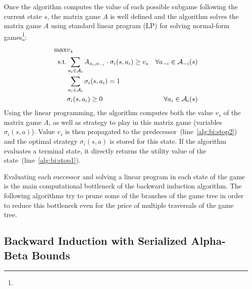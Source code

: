 Once the algorithm computes the value of each possible subgame following the current state $s$, the matrix game $A$ is well defined and the algorithm
solves the matrix game $A$ using standard linear program (LP) for solving normal-form games\footnote{}:
\begin{eqnarray}
\max & v_s & \\
\textrm{s.t.} & \sum_{a_i \in \mathcal{A}_{i}}A_{a_i,a_{-i}} \cdot \sigma_i(s,a_i) \geq v_s & \forall a_{-i} \in \mathcal{A}_{-i}(s)\\
& \sum_{a_{i} \in \mathcal{A}_{i}} \sigma_i(s,a_{i}) = 1 \\
& \sigma_i(s,a_{i}) \geq 0 & \forall a_{i} \in \mathcal{A}_{i}(s)
\end{eqnarray}
Using the linear programming, the algorithm computes both the value $v_s$ of the matrix game $A$, as well as strategy to play in this matrix game (variables $\sigma_i(s,a)$).
Value $v_s$ is then propagated to the predecessor~(line~\ref{alg:bi:stop2}) and the optimal strategy $\sigma_i(s,a)$ is stored for this state.
If the algorithm evaluates a terminal state, it directly returns the utility value of the state~(line~\ref{alg:bi:stop1}).

Evaluating each successor and solving a linear program in each state of the game is the main computational bottleneck of the backward induction algorithm.
The following algorithms try to prune some of the branches of the game tree in order to reduce this bottleneck even for the price of multiple traversals of the game tree.

\subsection{Backward Induction with Serialized Alpha-Beta Bounds}\label{sec:algs:biab}

